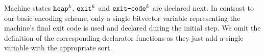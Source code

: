 


%






\noindent
Machine states $\texttt{heap}^k$, $\texttt{exit}^k$ and $\texttt{exit-code}^k$ are declared next.
In contrast to our basic encoding scheme, only a single bitvector variable representing the machine's final exit code is used and declared during the initial step.
We omit the definition of the corresponding declarator functions as they just add a single variable with the appropriate sort.

